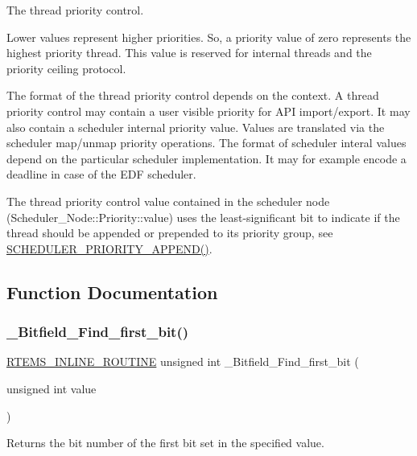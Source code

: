 The thread priority control. 

Lower values represent higher priorities. So, a priority value of zero represents the highest priority thread. This value is reserved for internal threads and the priority ceiling protocol.

The format of the thread priority control depends on the context. A thread priority control may contain a user visible priority for A\+PI import/export. It may also contain a scheduler internal priority value. Values are translated via the scheduler map/unmap priority operations. The format of scheduler interal values depend on the particular scheduler implementation. It may for example encode a deadline in case of the E\+DF scheduler.

The thread priority control value contained in the scheduler node (Scheduler\+\_\+\+Node\+::\+Priority\+::value) uses the least-\/significant bit to indicate if the thread should be appended or prepended to its priority group, see \mbox{\hyperlink{group__RTEMSScoreScheduler_ga2bc5f17fd4204768543893a50c09bd26}{S\+C\+H\+E\+D\+U\+L\+E\+R\+\_\+\+P\+R\+I\+O\+R\+I\+T\+Y\+\_\+\+A\+P\+P\+E\+N\+D()}}. 

\subsection{Function Documentation}
\mbox{\label{group__RTEMSScorePriority_gacf3f0ba39c90e26e3f821c04a2e48ee5}} 
\subsubsection{\texorpdfstring{\_Bitfield\_Find\_first\_bit()}{\_Bitfield\_Find\_first\_bit()}}
{\footnotesize\ttfamily \mbox{\hyperlink{group__RTEMSScoreBaseDefs_gac216239df231d5dbd15e3520b0b9313f}{R\+T\+E\+M\+S\+\_\+\+I\+N\+L\+I\+N\+E\+\_\+\+R\+O\+U\+T\+I\+NE}} unsigned int \+\_\+\+Bitfield\+\_\+\+Find\+\_\+first\+\_\+bit (\begin{DoxyParamCaption}\item[{unsigned int}]{value }\end{DoxyParamCaption})}



Returns the bit number of the first bit set in the specified value. 

